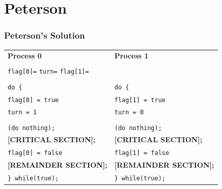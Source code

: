 \documentclass[aspectratio=169, xcolor=table, notheorems, hyperref={pdfpagelabels=false}]{beamer}
\begin{document}
\section{Peterson}
\begin{frame}
\frametitle{Peterson's Solution}
\begin{tabular}{l  l}
\textbf{Process 0} &
\textbf{Process 1} \\
&\\
\multicolumn{2}{l}{
\hspace{10pt}
\texttt{flag[0]=} 
\hspace{60pt}
\texttt{turn=}
\hspace{20pt}
\texttt{flag[1]=} 
} \\
&\\
\texttt{do \{} & 
\texttt{do \{} \\
\hspace{18pt}\texttt{flag[0] = true} &
\hspace{18pt}\texttt{flag[1] = true} \\
\hspace{18pt}\texttt{turn = 1} &
\hspace{18pt}\texttt{turn = 0} \\
\hspace{18pt}{while (flag[1] \&\& turn == 1)} &
\hspace{18pt}{while (flag[0] \&\& turn == 0)} \\
\hspace{28pt}\texttt{(do nothing);} &
\hspace{28pt}\texttt{(do nothing);} \\
\hspace{18pt}\textbf{[CRITICAL SECTION];} &
\hspace{18pt}\textbf{[CRITICAL SECTION];} \\
\hspace{18pt}\texttt{flag[0] = false} &
\hspace{18pt}\texttt{flag[1] = false} \\
\hspace{18pt}\textbf{[REMAINDER SECTION];} &
\hspace{18pt}\textbf{[REMAINDER SECTION];} \\
\texttt{\} while(true);} &
\texttt{\} while(true);} \\
\end{tabular}
\end{frame}

\end{document}

